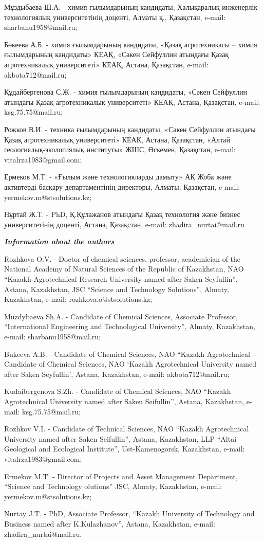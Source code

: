 Мұздыбаева Ш.А. - химия ғылымдарының кандидаты, Халықаралық
инженерлік-технологиялық университетінің доценті, Алматы қ., Қазақстан,
e-mail: sharbanu1958@mail.ru;

Бөкеева А.Б. - химия ғылымдарының кандидаты, «Қазақ агротехникасы --
химия ғылымдарының кандидаты» КЕАҚ, «Сәкен Сейфуллин атындағы Қазақ
агротехникалық университеті» КЕАҚ, Астана, Қазақстан, e-mail:
akbota712@mail.ru;

Құдайбергенова С.Ж. - химия ғылымдарының кандидаты, «Сәкен Сейфуллин
атындағы Қазақ агротехникалық университеті» КЕАҚ, Астана, Қазақстан,
e-mail: ksg.75.75@mail.ru;

Рожков В.И. - техника ғылымдарының кандидаты, «Сәкен Сейфуллин атындағы
Қазақ агротехникалық университеті» КЕАҚ, Астана, Қазақстан, «Алтай
геологиялық-экологиялық институты» ЖШС, Өскемен, Қазақстан, e-mail:
vitalrza1983@gmail.com;

Ермеков М.Т. - «Ғылым және технологияларды дамыту» АҚ Жоба және
активтерді басқару департаментінің директоры, Алматы, Қазақстан, e-mail:
yermekov.m@stsolutions.kz;

Нұртай Ж.Т. - PhD, Қ.Құлажанов атындағы Қазақ технология және бизнес
университетінің доценті, Астана, Қазақстан, e-mail:
zhadira\_nurtai@mail.ru

\emph{{\bfseries Information about the authors}}

Rozhkova O.V. - Doctor of chemical sciences, professor, academician of
the National Academy of Natural Sciences of the Republic of Kazakhstan,
NAO ``Kazakh Agrotechnical Research University named after Saken
Seyfullin'', Astana, Kazakhstan, JSC ``Science and Technology
Solutions'', Almaty, Kazakhstan, e-mail: rozhkova.o@stsolutions.kz;

Muzdybaeva Sh.A. - Candidate of Chemical Sciences, Associate Professor,
``International Engineering and Technological University'', Almaty,
Kazakhstan, e-mail: sharbanu1958@mail.ru;

Bukeeva A.B. - Candidate of Chemical Sciences, NAO ``Kazakh
Agrotechnical - Candidate of Chemical Sciences, NAO `Kazakh
Agrotechnical University named after Saken Seyfullin', Astana,
Kazakhstan, e-mail: akbota712@mail.ru;

Kudaibergenova S.Zh. - Candidate of Chemical Sciences, NAO ``Kazakh
Agrotechnical University named after Saken Seifullin'', Astana,
Kazakhstan, e-mail: ksg.75.75@mail.ru;

Rozhkov V.I. - Candidate of Technical Sciences, NAO ``Kazakh
Agrotechnical University named after Saken Seifullin'', Astana,
Kazakhstan, LLP ``Altai Geological and Ecological Institute'',
Ust-Kamenogorsk, Kazakhstan, e-mail: vitalrza1983@gmail.com;

Ermekov M.T. - Director of Projects and Asset Management Department,
``Science and Technology olutions'' JSC, Almaty, Kazakhstan, e-mail:
yermekov.m@stsolutions.kz;

Nurtay J.T. - PhD, Associate Professor, ``Kazakh University of
Technology and Business named after K.Kulazhanov'', Astana, Kazakhstan,
e-mail: zhadira\_nurtai@mail.ru.
